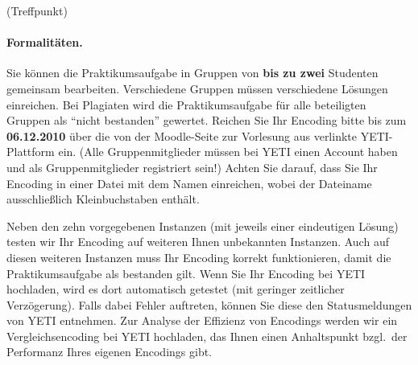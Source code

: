 \documentclass[a4paper,12pt,ngerman]{article}
\begin{document}
\begin{PraktikumsAufgabe}{1}{(Treffpunkt)}




\paragraph{Formalitäten.}
%
Sie können die Praktikumsaufgabe in Gruppen von \textbf{bis zu zwei} Studenten gemeinsam bearbeiten.
Verschiedene Gruppen müssen verschiedene Lösungen einreichen.
Bei Plagiaten wird die Praktikumsaufgabe für alle beteiligten Gruppen als ``nicht bestanden'' gewertet.
Reichen Sie Ihr Encoding bitte bis zum \textbf{06.12.2010}
über die von der Moodle-Seite zur Vorlesung aus verlinkte YETI-Plattform ein.
(Alle Gruppenmitglieder müssen bei YETI einen Account haben und als 
 Gruppenmitglieder registriert sein!)
Achten Sie darauf, dass Sie Ihr Encoding in einer Datei mit dem Namen  einreichen,
wobei der Dateiname ausschließlich Kleinbuchstaben enthält.

\noindent
Neben den zehn vorgegebenen Instanzen (mit jeweils einer eindeutigen L\"osung)
testen wir Ihr Encoding auf weiteren Ihnen unbekannten Instanzen.
Auch auf diesen weiteren Instanzen muss Ihr Encoding korrekt funktionieren,
damit die Praktikumsaufgabe als bestanden gilt.
Wenn Sie Ihr Encoding bei YETI hochladen, wird es dort automatisch getestet
(mit geringer zeitlicher Verz\"ogerung).
Falls dabei Fehler auftreten, k\"onnen Sie diese den Statusmeldungen von YETI entnehmen.
Zur Analyse der Effizienz von Encodings werden wir ein Vergleichsencoding 
bei YETI hochladen, das Ihnen einen Anhalts\-punkt bzgl.\ der Performanz Ihres
eigenen Encodings gibt.


\end{PraktikumsAufgabe}
\end{document}
